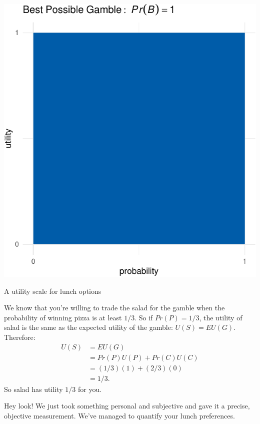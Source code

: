 \documentclass[justified]{tufte-book}
\renewcommand{\u}{U}
\newcommand{\p}{Pr}
\newcommand{\EU}{EU}
\theoremstyle{definition}
\theoremstyle{definition}
\theoremstyle{definition}
\theoremstyle{remark}
\begin{document}
\begin{marginfigure}
\includegraphics{_main_files/figure-latex/unnamed-chunk-109-1} \caption[A utility scale for lunch options]{A utility scale for lunch options}\label{fig:unnamed-chunk-109}
\end{marginfigure}

We know that you're willing to trade the salad for the gamble when the probability of winning pizza is at least \(1/3\). So if \(\p(P) = 1/3\), the utility of salad is the same as the expected utility of the gamble: \(\u(S) = \EU(G)\). Therefore:
\[
  \begin{aligned}
    \u(S) &= \EU(G)\\
      &= \p(P)\u(P) + \p(C)\u(C)\\
      &= (1/3)(1) + (2/3)(0)\\
      &= 1/3.
  \end{aligned}
\]
So salad has utility \(1/3\) for you.

Hey look! We just took something personal and subjective and gave it a precise, objective measurement. We've managed to quantify your lunch preferences.
\end{document}
